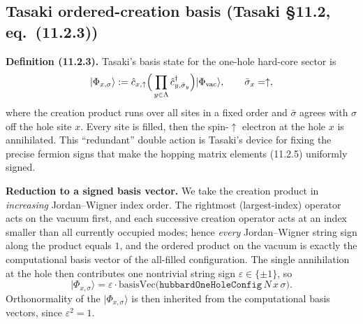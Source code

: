 \documentclass[a4paper,11pt]{article}
\begin{document}
\subsection{Tasaki ordered-creation basis (Tasaki §11.2, eq.~(11.2.3))}
\label{subsec:hubbard-tasaki-basis}

\noindent\textbf{Definition (11.2.3).}
Tasaki's basis state for the one-hole hard-core sector is
\[
  |\Phi_{x,\sigma}\rangle
    := \hat c_{x,\uparrow}
       \Big(\prod_{y\in\Lambda} \hat c^\dagger_{y,\bar\sigma_y}\Big)
       |\Phi_{\rm vac}\rangle,
  \qquad \bar\sigma_x = \uparrow,
\]
where the creation product runs over all sites in a fixed order and
\(\bar\sigma\) agrees with \(\sigma\) off the hole site \(x\). Every site is
filled, then the spin-\(\uparrow\) electron at the hole \(x\) is annihilated.
This ``redundant'' double action is Tasaki's device for fixing the precise
fermion signs that make the hopping matrix elements (11.2.5) uniformly signed.

\medskip
\noindent\textbf{Reduction to a signed basis vector.}
We take the creation product in \emph{increasing} Jordan--Wigner index order.
The rightmost (largest-index) operator acts on the vacuum first, and each
successive creation operator acts at an index smaller than all currently
occupied modes; hence \emph{every} Jordan--Wigner string sign along the product
equals \(1\), and the ordered product on the vacuum is exactly the
computational basis vector of the all-filled configuration. The single
annihilation at the hole then contributes one nontrivial string sign
\(\varepsilon\in\{\pm 1\}\), so
\[
  |\Phi_{x,\sigma}\rangle
    = \varepsilon \cdot \mathrm{basisVec}\big(\texttt{hubbardOneHoleConfig}\,
      N\,x\,\sigma\big).
\]
Orthonormality of the \(|\Phi_{x,\sigma}\rangle\) is then inherited from the
computational basis vectors, since \(\varepsilon^2 = 1\).
\end{document}

